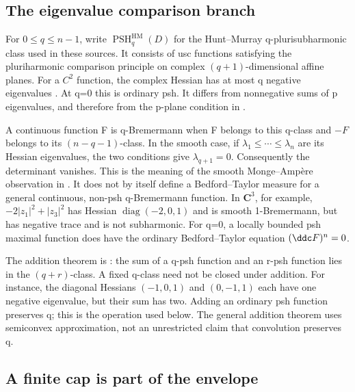 \subsection{The eigenvalue comparison branch}
\label{sec:appH-unbounded-q-branch}

For \(0\leq q\leq n-1\), write
\(\operatorname{PSH}^{\mathrm{HM}}_q(D)\) for the Hunt--Murray
q-plurisubharmonic class used in these sources. It consists of usc
functions satisfying the pluriharmonic comparison principle on complex
\((q+1)\)-dimensional affine planes. For a \(C^2\) function, the
complex Hessian has at most q negative eigenvalues
\cite[Theorem~2.8; actual p.~3]{Pawlaschyk26UnboundedPerronV1}.
At q=0 this is ordinary psh. It differs from nonnegative sums of p
eigenvalues, and therefore from the p-plane condition in
.

A continuous function F is q-Bremermann when F belongs to this q-class
and \(-F\) belongs to its \((n-q-1)\)-class. In the smooth case, if
\(\lambda_1\leq\cdots\leq\lambda_n\) are its Hessian eigenvalues,
the two conditions give \(\lambda_{q+1}=0\). Consequently the determinant
vanishes. This is the meaning of the smooth Monge--Amp\`ere observation
in \cite[Definition~5.2; printed p.~320]{Slodkowski84BremermannPublished}.
It does not by itself define a Bedford--Taylor measure for a general
continuous, non-psh q-Bremermann function. In \(\mathbf C^3\), for example,
\(-2|z_1|^2+|z_3|^2\) has Hessian \(\operatorname{diag}(-2,0,1)\)
and is smooth 1-Bremermann, but has negative trace and is not subharmonic.
For q=0, a locally bounded psh maximal function does have the ordinary
Bedford--Taylor equation \((\ddc F)^n=0\).

The addition theorem is
\cite[Theorem~5.1; printed pp.~319--320]{Slodkowski84BremermannPublished}:
the sum of a q-psh function and an r-psh function lies in the
\((q+r)\)-class. A fixed q-class need not be closed under addition.
For instance, the diagonal Hessians \((-1,0,1)\) and \((0,-1,1)\)
each have one negative eigenvalue, but their sum has two. Adding an
ordinary psh function preserves q; this is the operation used below.
The general addition theorem uses semiconvex approximation, not an
unrestricted claim that convolution preserves q.

\subsection{A finite cap is part of the envelope}
\label{sec:appH-unbounded-capped-envelope}

